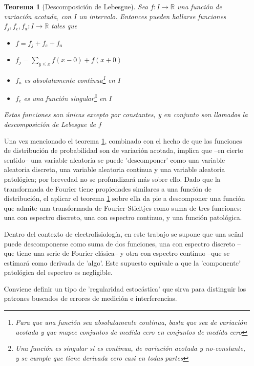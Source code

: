 \documentclass[12pt,a4paper]{mitthesis}
\newtheorem{thrm}{Teorema}
\newcommand{\R}{\mathbb{R}}
\begin{document}
\begin{thrm}[Descomposici\'on de Lebesgue]
Sea $f:I\rightarrow \R$ una funci\'on de variaci\'on acotada, con $I$ un intervalo. Entonces pueden 
hallarse funciones $f_j, f_c, f_a :I\rightarrow \R$ tales que
\begin{itemize}
\item $f = f_j+ f_c+ f_a$
\item $f_j = \sum_{y \leq x} f(x-0) + f(x+0)$
\item $f_a$ es absolutamente continua\footnote{Para que una funci\'on sea absolutamente continua,
basta que sea de variaci\'on acotada y que mapee conjuntos de medida cero en conjuntos de medida
cero} en $I$
\item $f_c$ es una funci\'on singular\footnote{Una funci\'on es singular si es continua, de 
variaci\'on acotada y no-constante, y se cumple que tiene derivada cero casi en todas partes} en 
$I$
\end{itemize}
Estas funciones son \'unicas excepto por constantes, y en conjunto son llamados la 
\textit{descomposici\'on de Lebesgue} de $f$
\label{Lebesgue_decomp}
\end{thrm}

Una vez mencionado el teorema \ref{Lebesgue_decomp}, combinado con el hecho de que las funciones de 
distribuci\'on de probabilidad son de variaci\'on acotada, implica que --en cierto sentido-- una 
variable aleatoria se puede 'descomponer' como una variable aleatoria discreta, una variable 
aleatoria continua y una variable aleatoria patol\'ogica; por brevedad no se profundizar\'a m\'as 
sobre ello.
Dado que la transformada de Fourier tiene propiedades similares a una funci\'on de distribuci\'on,
el aplicar el teorema \ref{Lebesgue_decomp} sobre ella da pie a descomponer una funci\'on que 
admite una transformada de Fourier-Stieltjes como suma de tres funciones: una con espectro 
discreto, una con espectro continuo, y una funci\'on patol\'ogica.

Dentro del contexto de electrofisiolog\'ia, en este trabajo se supone que una se\~nal puede 
descomponerse como suma de dos funciones, una con espectro discreto --que tiene una serie de 
Fourier cl\'asica-- y otra con espectro continuo --que se estimar\'a como derivada de 'algo'. Este 
supuesto equivale a que la 'componente' patol\'ogica del espectro es negligible.

Conviene definir un tipo de 'regularidad estoc\'astica' que sirva para distinguir los patrones 
buscados de errores de medici\'on e interferencias.
\end{document}
